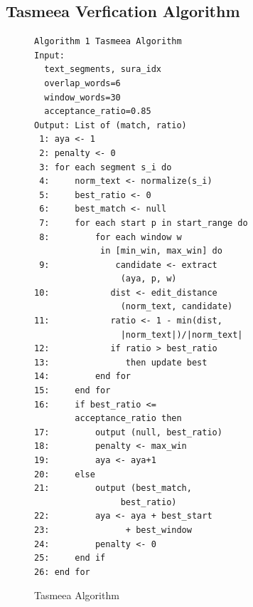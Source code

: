\subsection{Tasmeea Verfication Algorithm}

\begin{figure}[htbp]
  \centering
  \small
  \begin{verbatim}
Algorithm 1 Tasmeea Algorithm
Input:
  text_segments, sura_idx
  overlap_words=6
  window_words=30
  acceptance_ratio=0.85
Output: List of (match, ratio)
 1: aya <- 1
 2: penalty <- 0
 3: for each segment s_i do
 4:     norm_text <- normalize(s_i)
 5:     best_ratio <- 0
 6:     best_match <- null
 7:     for each start p in start_range do
 8:         for each window w
             in [min_win, max_win] do
 9:             candidate <- extract
                 (aya, p, w)
10:            dist <- edit_distance
                 (norm_text, candidate)
11:            ratio <- 1 - min(dist,
                 |norm_text|)/|norm_text|
12:            if ratio > best_ratio
13:               then update best
14:         end for
15:     end for
16:     if best_ratio <=
        acceptance_ratio then
17:         output (null, best_ratio)
18:         penalty <- max_win
19:         aya <- aya+1
20:     else
21:         output (best_match,
                 best_ratio)
22:         aya <- aya + best_start
23:               + best_window
24:         penalty <- 0
25:     end if
26: end for
  \end{verbatim}
  \caption{Tasmeea Algorithm}
  \label{alg:tasmeea}
\end{figure}

